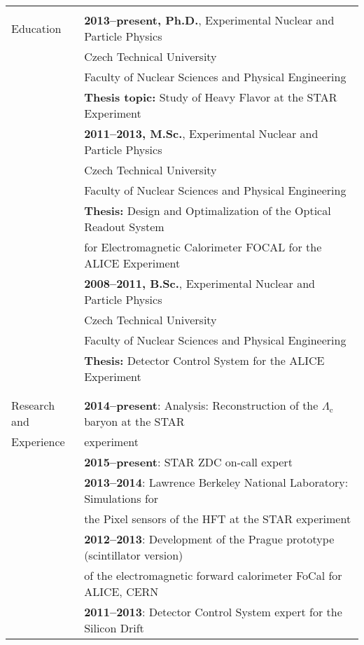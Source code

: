 \documentclass[a4paper,11pt,oneside]{article}
\begin{document}
\noindent \begin{tabular}{@{} l l}
\hline \\
 \Large{Education}   
     & \textbf{2013--present, Ph.D.}, Experimental Nuclear and Particle Physics \\
     & {Czech Technical University} \\
     & {Faculty of Nuclear Sciences and Physical Engineering} \\
     & \textbf{Thesis topic:} Study of Heavy Flavor at the STAR Experiment \\[.2cm]
     & \textbf{2011--2013, M.Sc.}, Experimental Nuclear and Particle Physics \\
     & {Czech Technical University} \\
     & {Faculty of Nuclear Sciences and Physical Engineering} \\
     & \textbf{Thesis:} Design and Optimalization of the Optical Readout System \\
     & for Electromagnetic Calorimeter FOCAL for the ALICE Experiment \\[.2cm]
     & \textbf{2008--2011, B.Sc.}, Experimental Nuclear and Particle Physics \\
     & {Czech Technical University} \\
     & {Faculty of Nuclear Sciences and Physical Engineering} \\
     & \textbf{Thesis:} Detector Control System for the ALICE Experiment \\
     & \\
     \\
 \Large{Research and}    & \textbf{2014--present}: Analysis: Reconstruction of the $\Lambda_\mathrm{c}$ baryon  at the STAR \\
 \Large{Experience}    & experiment \\[.2cm]
     & \textbf{2015--present}: STAR ZDC on-call expert \\[.2cm]
     & \textbf{2013--2014}: Lawrence Berkeley National Laboratory: Simulations for\\ 
     & the Pixel sensors of the HFT at the STAR experiment \\[.2cm]
     & \textbf{2012--2013}: Development of the Prague prototype (scintillator version) \\ 
     & of the electromagnetic forward calorimeter FoCal for ALICE, CERN\\[.2cm]
     & \textbf{2011--2013}: Detector Control System expert for the Silicon Drift \\

\end{tabular}
\end{document}
